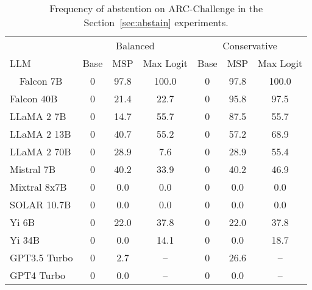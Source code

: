 \begin{table*}[h]
\centering
\caption{Frequency of abstention on ARC-Challenge in the Section~\ref{sec:abstain} experiments.}
\label{tab:arc_pct_abstained}
\begin{tabular}{lcccccc}
\toprule
& \multicolumn{3}{c}{Balanced} & \multicolumn{3}{c}{Conservative} \\ 
LLM & Base & MSP & Max Logit & Base & MSP & Max Logit \\ 
\cmidrule(lr){1-1}\cmidrule(lr){2-4}\cmidrule(lr){5-7}\ \ 
Falcon 7B & 0 & 97.8 & 100.0 & 0 & 97.8 & 100.0\\
Falcon 40B & 0 & 21.4 & 22.7 & 0 & 95.8 & 97.5\\
LLaMA 2 7B & 0 & 14.7 & 55.7 & 0 & 87.5 & 55.7\\
LLaMA 2 13B & 0 & 40.7 & 55.2 & 0 & 57.2 & 68.9\\
LLaMA 2 70B & 0 & 28.9 & 7.6 & 0 & 28.9 & 55.4\\
Mistral 7B & 0 & 40.2 & 33.9 & 0 & 40.2 & 46.9\\
Mixtral 8x7B & 0 & 0.0 & 0.0 & 0 & 0.0 & 0.0\\
SOLAR 10.7B & 0 & 0.0 & 0.0 & 0 & 0.0 & 0.0\\
Yi 6B & 0 & 22.0 & 37.8 & 0 & 22.0 & 37.8\\
Yi 34B & 0 & 0.0 & 14.1 & 0 & 0.0 & 18.7\\
GPT3.5 Turbo & 0 & 2.7 & -- & 0 & 26.6 & --\\
GPT4 Turbo & 0 & 0.0 & -- & 0 & 0.0 & --\\
\bottomrule
\end{tabular}
\end{table*}
